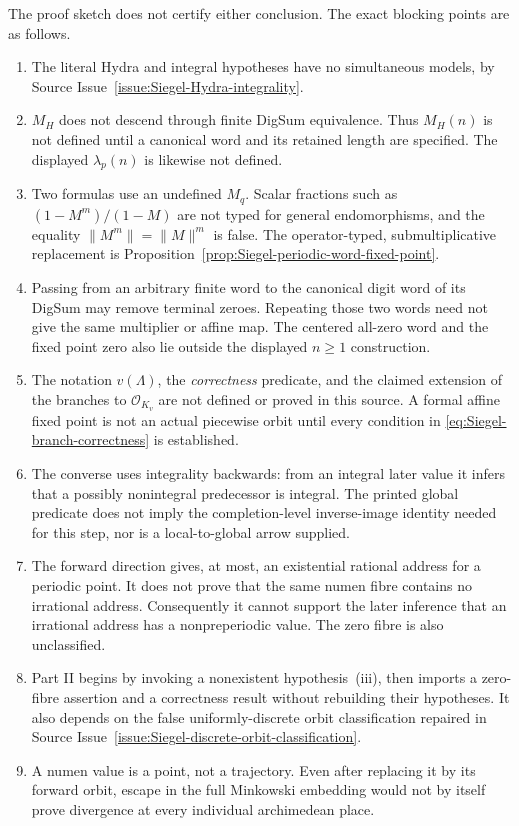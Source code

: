 The proof sketch does not certify either conclusion.  The exact blocking
points are as follows.
\begin{enumerate}
\item The literal Hydra and integral hypotheses have no simultaneous models,
  by Source Issue~\ref{issue:Siegel-Hydra-integrality}.
\item $M_H$ does not descend through finite DigSum equivalence.  Thus
  $M_H(n)$ is not defined until a canonical word and its retained length are
  specified.  The displayed $\lambda_p(n)$ is likewise not defined.
\item Two formulas use an undefined $M_q$.  Scalar fractions such as
  $(1-M^m)/(1-M)$ are not typed for general endomorphisms, and the equality
  $\lVert M^m\rVert=\lVert M\rVert^m$ is false.  The operator-typed,
  submultiplicative replacement is
  Proposition~\ref{prop:Siegel-periodic-word-fixed-point}.
\item Passing from an arbitrary finite word to the canonical digit word of
  its DigSum may remove terminal zeroes.  Repeating those two words need not
  give the same multiplier or affine map.  The centered all-zero word and
  the fixed point zero also lie outside the displayed $n\geq1$ construction.
\item The notation $v(\Lambda)$, the \emph{correctness} predicate, and the
  claimed extension of the branches to $\mathcal O_{K_v}$ are not defined or
  proved in this source.  A formal affine fixed point is not an actual
  piecewise orbit until every condition in
  \eqref{eq:Siegel-branch-correctness} is established.
\item The converse uses integrality backwards: from an integral later value
  it infers that a possibly nonintegral predecessor is integral.  The
  printed global predicate does not imply the completion-level inverse-image
  identity needed for this step, nor is a local-to-global arrow supplied.
\item The forward direction gives, at most, an existential rational address
  for a periodic point.  It does not prove that the same numen fibre contains
  no irrational address.  Consequently it cannot support the later inference
  that an irrational address has a nonpreperiodic value.  The zero fibre is
  also unclassified.
\item Part II begins by invoking a nonexistent hypothesis~(iii), then imports
  a zero-fibre assertion and a correctness result without rebuilding their
  hypotheses.  It also depends on the false uniformly-discrete orbit
  classification repaired in
  Source Issue~\ref{issue:Siegel-discrete-orbit-classification}.
\item A numen value is a point, not a trajectory.  Even after replacing it
  by its forward orbit, escape in the full Minkowski embedding would not by
  itself prove divergence at every individual archimedean place.
\end{enumerate}

